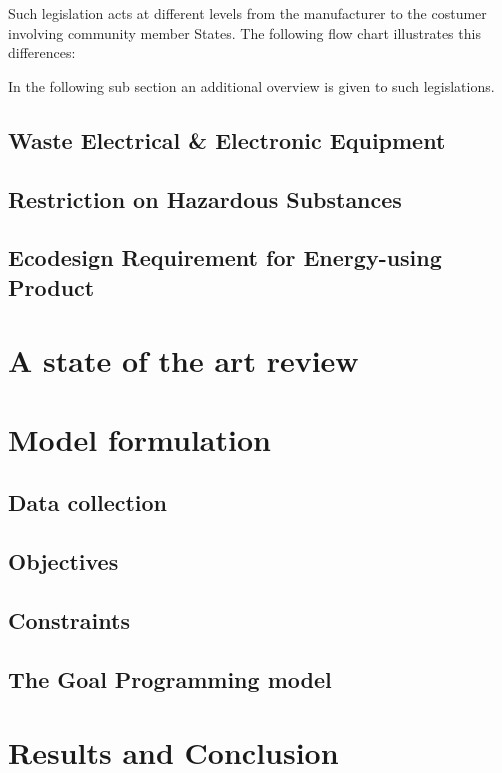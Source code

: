 \documentclass{article}
\begin{document}
Such legislation acts at different levels from the manufacturer to the costumer involving community member States. The following flow chart illustrates this differences:

In the following sub section an additional overview is given to such legislations.

\subsection{Waste Electrical \& Electronic Equipment}
\subsection{Restriction on Hazardous Substances}
\subsection{Ecodesign Requirement for Energy-using Product}

\section{A state of the art review}

\section{Model formulation}
\subsection{Data collection}
\subsection{Objectives}
\subsection{Constraints}
\subsection{The Goal Programming model}

\section{Results and Conclusion}

\printbibliography
\end{document}
